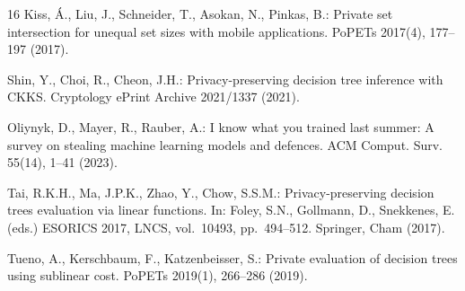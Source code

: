 \documentclass[runningheads]{llncs}
\begin{document}
\begin{thebibliography}{16}
Kiss, \'{A}., Liu, J., Schneider, T., Asokan, N., Pinkas, B.:
Private set intersection for unequal set sizes with mobile applications.
PoPETs 2017(4), 177--197 (2017).

Shin, Y., Choi, R., Cheon, J.H.:
Privacy-preserving decision tree inference with CKKS.
Cryptology ePrint Archive 2021/1337 (2021).

Oliynyk, D., Mayer, R., Rauber, A.:
I know what you trained last summer: A survey on stealing machine learning models and defences.
ACM Comput. Surv. 55(14), 1--41 (2023).

Tai, R.K.H., Ma, J.P.K., Zhao, Y., Chow, S.S.M.:
Privacy-preserving decision trees evaluation via linear functions.
In: Foley, S.N., Gollmann, D., Snekkenes, E. (eds.) ESORICS 2017, LNCS,
vol.~10493, pp.~494--512. Springer, Cham (2017).

Tueno, A., Kerschbaum, F., Katzenbeisser, S.:
Private evaluation of decision trees using sublinear cost.
PoPETs 2019(1), 266--286 (2019).

\end{thebibliography}
\end{document}
